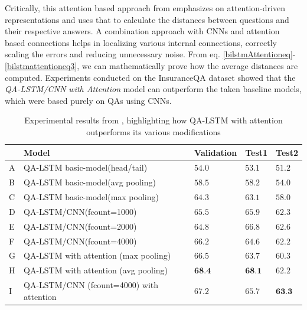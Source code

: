 \documentclass[a4paper,12pt]{report}
\begin{document}
            Critically, this attention based approach from \citep{lstmhaighextractive} emphasizes on attention-driven representations and uses that to calculate the distances between questions and their respective answers. A combination approach with CNNs and attention based connections helps in localizing various internal connections, correctly scaling the errors and reducing unnecessary noise. From eq. \ref{bilstmAttentioneq}-\ref{bilstmattentioneq3}, \citep{lstmhaighextractive} we can mathematically prove how the average distances are computed.
            Experiments conducted on the InsuranceQA dataset showed that the \textit{QA-LSTM/CNN with Attention} model can outperform the taken baseline models, which were based purely on QAs using CNNs.
            \begin{table}
                \begin{tabular}{|l|llll|}
                    \hline & Model & Validation & Test1 & Test2 \\
                    \hline A & QA-LSTM basic-model(head/tail) & $54.0$ & $53.1$ & $51.2$ \\
                    B & QA-LSTM basic-model(avg pooling) & $58.5$ & $58.2$ & $54.0$ \\
                    C & QA-LSTM basic-model(max pooling) & $64.3$ & $63.1$ & $58.0$ \\
                    \hline D & QA-LSTM/CNN(fcount=1000) & $65.5$ & $65.9$ & $62.3$ \\
                    E & QA-LSTM/CNN(fcount=2000) & $64.8$ & $66.8$ & $62.6$ \\
                    F & QA-LSTM/CNN(fcount=4000) & $66.2$ & $64.6$ & $62.2$ \\
                    \hline G & QA-LSTM with attention (max pooling) & $66.5$ & $63.7$ & $60.3$ \\
                    H & QA-LSTM with attention (avg pooling) & $\mathbf{6 8 . 4}$ & $\mathbf{6 8 . 1}$ & $62.2$ \\
                    I & QA-LSTM/CNN (fcount=4000) with attention & $67.2$ & $65.7$ & $\mathbf{6 3 . 3}$ \\
                    \hline
                \end{tabular}
                \caption{Experimental results from \citep{lstmhaighextractive}, highlighting how QA-LSTM with attention outperforms its various modifications}\label{lstmhaigexperiementresults}
            \end{table}
\end{document}
